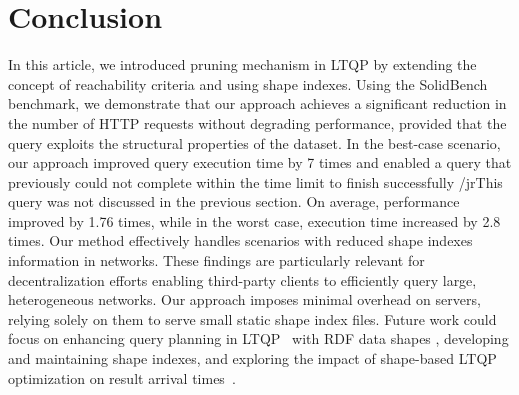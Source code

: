 \section{Conclusion}\label{sec:conclusion}

In this article, we introduced pruning mechanism in LTQP by extending the concept of reachability criteria and using shape indexes.
Using the SolidBench benchmark, we demonstrate that our approach achieves a significant reduction in the number of HTTP requests without degrading performance, provided that the query exploits the structural properties of the dataset.
In the best-case scenario, our approach improved query execution time by 7 times and enabled a query that previously could not complete within the time limit to finish successfully /jr{This query was not discussed in the previous section}.
On average, performance improved by 1.76 times, while in the worst case, execution time increased by 2.8 times.
Our method effectively handles scenarios with reduced shape indexes information in networks.
These findings are particularly relevant for decentralization efforts enabling third-party clients to efficiently query large, heterogeneous networks.
Our approach imposes minimal overhead on servers, relying solely on them to serve small static shape index files.
Future work could focus on enhancing query planning in LTQP~\cite{taelman2024towards} with RDF data shapes , developing and maintaining shape indexes, and exploring the impact of shape-based LTQP optimization on result arrival times~\cite{Acosta2017}.

